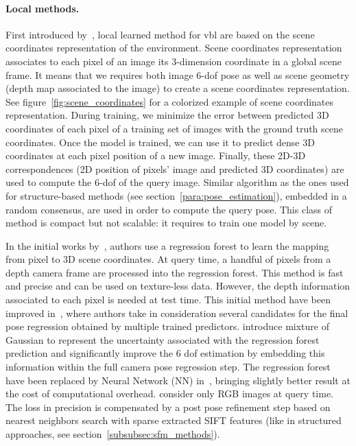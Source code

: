 \paragraph{Local methods.}

First introduced by~\citet{Shotton2013}, local learned method for \ac{vbl} are based on the scene coordinates representation of the environment. Scene coordinates representation associates to each pixel of an image its 3-dimension coordinate in a global scene frame. It means that we requires both image 6-\ac{dof} pose as well as scene geometry (\eg depth map associated to the image) to create a scene coordinates representation. See figure~\ref{fig:scene_coordinates} for a colorized example of scene coordinates representation. During training, we minimize the error between predicted 3D coordinates of each pixel of a training set of images with the ground truth scene coordinates. Once the model is trained, we can use it to predict dense 3D coordinates at each pixel position of a new image. Finally, these 2D-3D correspondences (2D position of pixels' image and predicted 3D coordinates) are used to compute the 6-\ac{dof} of the query image. Similar algorithm as the ones used for structure-based methods (see section~\ref{para:pose_estimation}), embedded in a random consensus, are used in order to compute the query pose. This class of method is compact but not scalable: it requires to train one model by scene.

In the initial works by~\citet{Shotton2013}, authors use a regression forest to learn the mapping from pixel to 3D scene coordinates. At query time, a handful of pixels from a depth camera frame are processed into the regression forest. This method is fast and precise and can be used on texture-less data. However, the depth information associated to each pixel is needed at test time. This initial method have been improved in~\citep{Guzman-rivera2014}, where authors take in consideration several candidates for the final pose regression obtained by multiple trained predictors. \citet{Valentin2015} introduce mixture of Gaussian to represent the uncertainty associated with the regression forest prediction and significantly improve the 6 \ac{dof} estimation by embedding this information within the full camera pose regression step. The regression forest have been replaced by Neural Network (NN) in~\citep{Massiceti2016}, bringing slightly better result at the cost of computational overhead. \citet{Meng2016} consider only RGB images at query time. The loss in precision is compensated by a post pose refinement step based on nearest neighbors search with sparse extracted SIFT features (like in structured approaches, see section~\ref{subsubsec:sfm_methods}).

